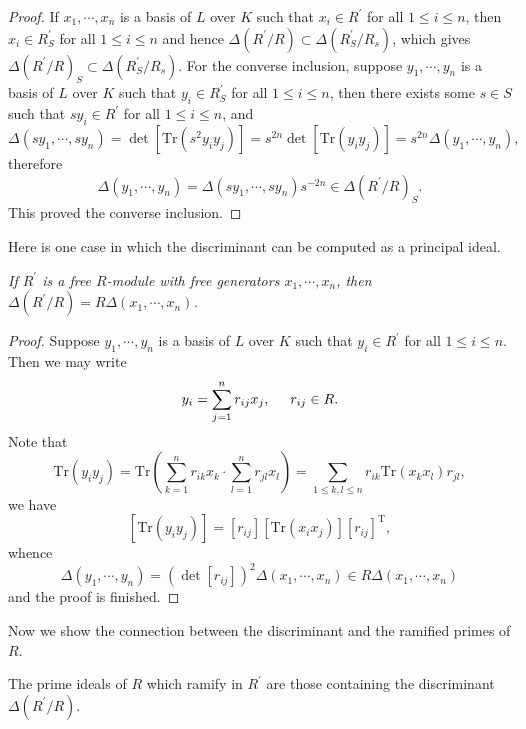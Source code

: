 \begin{proof}
If $x_1,\cdots,x_n$ is a basis of $L$ over $K$ such that $x_i\in R^\prime$ for all $1\le i\le n$, then $x_i\in R_S^\prime$ for all $1\le i\le n$ and hence $\Delta \left( R^{\prime}/R \right) \subset \Delta \left( R_{S}^{\prime}/R_s \right) $, which gives $\Delta \left( R^{\prime}/R \right) _S\subset \Delta \left( R_{S}^{\prime}/R_s \right) $. For the converse inclusion, suppose $y_1,\cdots,y_n$ is a basis of $L$ over $K$ such that $y_i\in R_S^\prime$ for all $1\le i\le n$, then there exists some $s\in S$ such that $sy_i\in R^\prime$ for all $1\le i\le n$, and 
$$
\Delta \left( sy_1,\cdots ,sy_n \right) =\det \left[ \mathrm{Tr}\left( s^2y_iy_j \right) \right] =s^{2n}\det \left[ \mathrm{Tr}\left( y_iy_j \right) \right] =s^{2n}\Delta \left( y_1,\cdots ,y_n \right) ,
$$
therefore 
$$
\Delta \left( y_1,\cdots ,y_n \right) =\Delta \left( sy_1,\cdots ,sy_n \right) s^{-2n}\in \Delta \left( R^{\prime}/R \right) _S.
$$
This proved the converse inclusion.
\end{proof}
Here is one case in which the discriminant can be computed as a principal ideal.
\begin{lemma}\em\label{discriminantPI}
If $R^\prime$ is a free $R$-module with free generators $x_1,\cdots,x_n$, then $\Delta(R^\prime/R)=R\Delta(x_1,\cdots,x_n)$.
\end{lemma}
\begin{proof}
Suppose $y_1,\cdots,y_n$ is a basis of $L$ over $K$ such that $y_i\in R^\prime$ for all $1\le i\le n$. Then we may write 
$$
y_i=\sum_{j=1}^n{r_{ij}x_j},\hspace{0.5cm}r_{ij}\in R.
$$
Note that 
$$
\mathrm{Tr}\left( y_iy_j \right) =\mathrm{Tr}\left( \sum_{k=1}^n{r_{ik}x_k}\cdot \sum_{l=1}^n{r_{jl}x_l} \right) =\sum_{1\le k,l\le n}{r_{ik}\mathrm{Tr}\left( x_kx_l \right) r_{jl}},
$$
we have 
$$
\left[ \mathrm{Tr}\left( y_iy_j \right) \right] =\left[ r_{ij} \right] \left[ \mathrm{Tr}\left( x_ix_j \right) \right] \left[ r_{ij} \right] ^{\mathrm{T}},
$$
whence 
$$
\Delta \left( y_1,\cdots ,y_n \right) =\left( \det \left[ r_{ij} \right] \right) ^2\Delta \left( x_1,\cdots ,x_n \right) \in R\Delta \left( x_1,\cdots ,x_n \right) 
$$
and the proof is finished.
\end{proof}
Now we show the connection between the discriminant and the ramified primes of $R$.
\begin{theorem}
The prime ideals of $R$ which ramify in $R^\prime$ are those containing the discriminant $\Delta(R^\prime/R)$.
\end{theorem}
